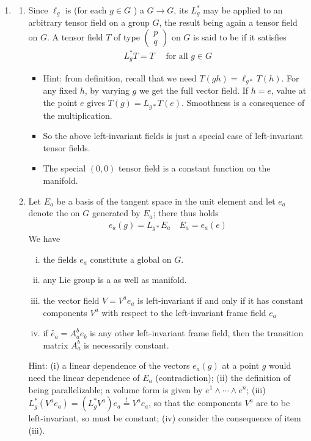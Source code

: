 \documentclass{article}
\begin{document}
\begin{enumerate}
\item {}
\begin{enumerate}
    \item  {} Since $\ell_g$ is (for each $g \in G$ ) a  $G \rightarrow G$, its  $L_g^*$ may be applied to an arbitrary tensor field on a group $G$, the result being again a tensor field on $G$.  A tensor field $T$ of type $\left(\begin{array}{l}p \\ q\end{array}\right)$ on $G$ is said to be  if it satisfies
\begin{align*}
L_g^* T=T \quad \text { for all } g \in G
\end{align*}
\begin{itemize}
    \item {} 
{\tiny Hint: from definition, recall that we need $T(g h)=\ell_{g *} T(h)$. For any fixed $h$, by varying $g$ we get the full vector field. If $h=e$, value at the point $e$ gives $T(g)=L_{g *} T(e)$. Smoothness is a consequence of the  multiplication.
}
\item So the above left-invariant  fields is just a special case of left-invariant tensor fields. 
\item The special $(0,0)$ tensor field is a constant function on the manifold. 
\end{itemize}
\item  Let $E_a$ be a basis of the tangent space in the unit element and let $e_a$ denote the  on $G$ generated by $E_a$; there thus holds
\begin{align*}
e_a(g)=L_{g *} E_a \quad E_a=e_a(e)
\end{align*}
We have
\begin{enumerate}[(i).]
    \item the fields $e_a$ constitute a global   on $G$.
    \item  any Lie group is a  as well as  manifold.
   \item  the vector field $V=V^a e_a$ is left-invariant if and only if it has constant components $V^a$ with respect to the left-invariant frame field $e_a$
\item if $\hat{e}_a=A_a^b e_b$ is any other left-invariant frame field, then the transition matrix $A_a^b$ is necessarily constant.
\end{enumerate}
{\tiny Hint: (i) a linear dependence of the vectors $e_a(g)$ at a point $g$ would need the linear dependence of $E_a$ (contradiction); (ii) the definition of being parallelizable; a volume form is given by $e^1 \wedge \cdots \wedge e^n$; (iii) $L_g^*\left(V^a e_a\right)=\left(L_g^* V^a\right) e_a \stackrel{!}{=} V^a e_a$, so that the components $V^a$ are to be left-invariant, so must be constant; (iv) consider the consequence of item (iii).}
\end{enumerate}


\end{enumerate}
\end{document}
